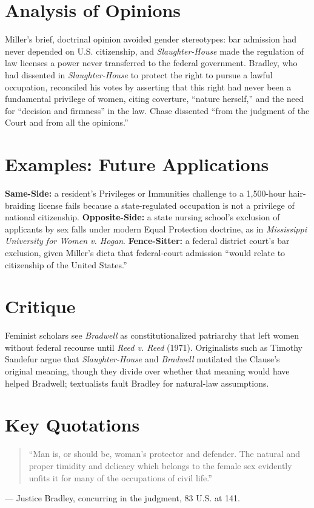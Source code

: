 \documentclass[12pt]{article}
\begin{document}
\section{Analysis of Opinions}
Miller's brief, doctrinal opinion avoided gender stereotypes: bar admission had never depended on U.S. citizenship, and \textit{Slaughter-House} made the regulation of law licenses a power never transferred to the federal government. Bradley, who had dissented in \textit{Slaughter-House} to protect the right to pursue a lawful occupation, reconciled his votes by asserting that this right had never been a fundamental privilege of women, citing coverture, ``nature herself,'' and the need for ``decision and firmness'' in the law. Chase dissented ``from the judgment of the Court and from all the opinions.''

\section{Examples: Future Applications}
\textbf{Same-Side:} a resident's Privileges or Immunities challenge to a 1,500-hour hair-braiding license fails because a state-regulated occupation is not a privilege of national citizenship. \textbf{Opposite-Side:} a state nursing school's exclusion of applicants by sex falls under modern Equal Protection doctrine, as in \textit{Mississippi University for Women v. Hogan}. \textbf{Fence-Sitter:} a federal district court's bar exclusion, given Miller's dicta that federal-court admission ``would relate to citizenship of the United States.''

\section{Critique}
Feminist scholars see \textit{Bradwell} as constitutionalized patriarchy that left women without federal recourse until \textit{Reed v. Reed} (1971). Originalists such as Timothy Sandefur argue that \textit{Slaughter-House} and \textit{Bradwell} mutilated the Clause's original meaning, though they divide over whether that meaning would have helped Bradwell; textualists fault Bradley for natural-law assumptions.

\section{Key Quotations}
\begin{quote}
``Man is, or should be, woman's protector and defender. The natural and proper timidity and delicacy which belongs to the female sex evidently unfits it for many of the occupations of civil life.''
\end{quote}
\noindent --- Justice Bradley, concurring in the judgment, 83 U.S. at 141.
\end{document}
